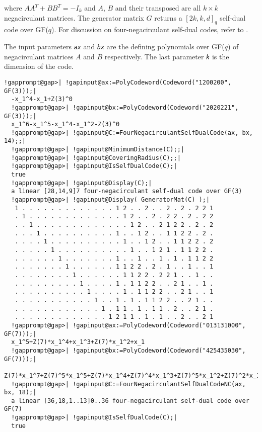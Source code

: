 \documentclass[a4paper,11pt]{report}
\begin{document}
{{{\begin{verbatim}
\end{verbatim}
 where $AA^T + BB^T = -I_k$ and $A$, $B$ and their transposed are all $k \times k$ negacirculant matrices. The generator matrix $G$ returns a $[2k, k, d]_q$ self-dual code over GF($q$). For discussion on four-negacirculant self-dual codes, refer to \cite{HHKK07}. 

 The input parameters \mbox{\texttt{\mdseries\slshape ax}} and \mbox{\texttt{\mdseries\slshape bx}} are the defining polynomials over GF($q$) of negacirculant matrices $A$ and $B$ respectively. The last parameter \mbox{\texttt{\mdseries\slshape k}} is the dimension of the code. }

 
\begin{Verbatim}[commandchars=!@|,fontsize=\small,frame=single,label=Example]
  !gapprompt@gap>| !gapinput@ax:=PolyCodeword(Codeword("1200200", GF(3)));|
  -x_1^4-x_1+Z(3)^0
  !gapprompt@gap>| !gapinput@bx:=PolyCodeword(Codeword("2020221", GF(3)));|
  x_1^6-x_1^5-x_1^4-x_1^2-Z(3)^0
  !gapprompt@gap>| !gapinput@C:=FourNegacirculantSelfDualCode(ax, bx, 14);;|
  !gapprompt@gap>| !gapinput@MinimumDistance(C);;|
  !gapprompt@gap>| !gapinput@CoveringRadius(C);;|
  !gapprompt@gap>| !gapinput@IsSelfDualCode(C);|
  true
  !gapprompt@gap>| !gapinput@Display(C);|
  a linear [28,14,9]7 four-negacirculant self-dual code over GF(3)
  !gapprompt@gap>| !gapinput@Display( GeneratorMat(C) );|
   1 . . . . . . . . . . . . . 1 2 . . 2 . . 2 . 2 . 2 2 1
   . 1 . . . . . . . . . . . . . 1 2 . . 2 . 2 2 . 2 . 2 2
   . . 1 . . . . . . . . . . . . . 1 2 . . 2 1 2 2 . 2 . 2
   . . . 1 . . . . . . . . . . 1 . . 1 2 . . 1 1 2 2 . 2 .
   . . . . 1 . . . . . . . . . . 1 . . 1 2 . . 1 1 2 2 . 2
   . . . . . 1 . . . . . . . . . . 1 . . 1 2 1 . 1 1 2 2 .
   . . . . . . 1 . . . . . . . 1 . . 1 . . 1 . 1 . 1 1 2 2
   . . . . . . . 1 . . . . . . 1 1 2 2 . 2 . 1 . . 1 . . 1
   . . . . . . . . 1 . . . . . . 1 1 2 2 . 2 2 1 . . 1 . .
   . . . . . . . . . 1 . . . . 1 . 1 1 2 2 . . 2 1 . . 1 .
   . . . . . . . . . . 1 . . . . 1 . 1 1 2 2 . . 2 1 . . 1
   . . . . . . . . . . . 1 . . 1 . 1 . 1 1 2 2 . . 2 1 . .
   . . . . . . . . . . . . 1 . 1 1 . 1 . 1 1 . 2 . . 2 1 .
   . . . . . . . . . . . . . 1 2 1 1 . 1 . 1 . . 2 . . 2 1
  !gapprompt@gap>| !gapinput@ax:=PolyCodeword(Codeword("013131000", GF(7)));|
  x_1^5+Z(7)*x_1^4+x_1^3+Z(7)*x_1^2+x_1
  !gapprompt@gap>| !gapinput@bx:=PolyCodeword(Codeword("425435030", GF(7)));|
  Z(7)*x_1^7+Z(7)^5*x_1^5+Z(7)*x_1^4+Z(7)^4*x_1^3+Z(7)^5*x_1^2+Z(7)^2*x_1+Z(7)^4
  !gapprompt@gap>| !gapinput@C:=FourNegacirculantSelfDualCodeNC(ax, bx, 18);|
  a linear [36,18,1..13]0..36 four-negacirculant self-dual code over GF(7)
  !gapprompt@gap>| !gapinput@IsSelfDualCode(C);|
  true
\end{Verbatim}

}}
\end{document}
